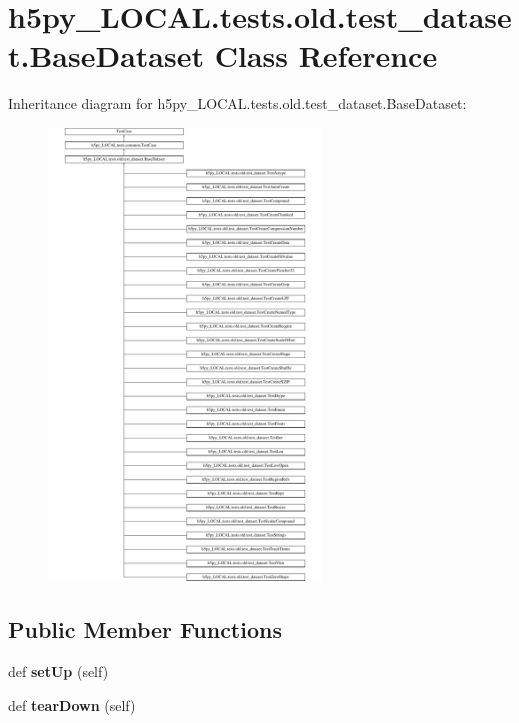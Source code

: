 \hypertarget{classh5py__LOCAL_1_1tests_1_1old_1_1test__dataset_1_1BaseDataset}{}\section{h5py\+\_\+\+L\+O\+C\+A\+L.\+tests.\+old.\+test\+\_\+dataset.\+Base\+Dataset Class Reference}
\label{classh5py__LOCAL_1_1tests_1_1old_1_1test__dataset_1_1BaseDataset}
Inheritance diagram for h5py\+\_\+\+L\+O\+C\+A\+L.\+tests.\+old.\+test\+\_\+dataset.\+Base\+Dataset\+:\begin{figure}[H]
\begin{center}
\leavevmode
\includegraphics[height=12.000000cm]{classh5py__LOCAL_1_1tests_1_1old_1_1test__dataset_1_1BaseDataset}
\end{center}
\end{figure}
\subsection*{Public Member Functions}
\begin{DoxyCompactItemize}
\item 
\mbox{\label{classh5py__LOCAL_1_1tests_1_1old_1_1test__dataset_1_1BaseDataset_a325755a868ce3698ecd110892c084b69}} 
def {\bfseries set\+Up} (self)
\item 
\mbox{\label{classh5py__LOCAL_1_1tests_1_1old_1_1test__dataset_1_1BaseDataset_a25917ab4442dfe6aa01ed18393149ba1}} 
def {\bfseries tear\+Down} (self)
\end{DoxyCompactItemize}
